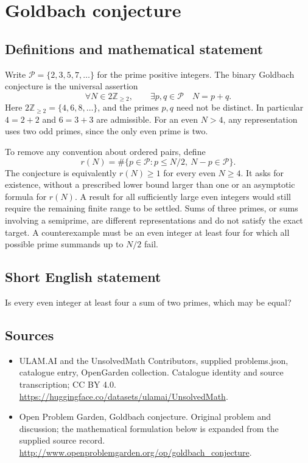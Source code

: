 \documentclass[11pt,a4paper]{article}
\begin{document}
\section*{Goldbach conjecture}\label{statement}

\subsection{Definitions and mathematical statement}
Write $\mathcal P=\{2,3,5,7,\ldots\}$ for the prime positive integers.
The binary Goldbach conjecture is the universal assertion
\[
 \forall N\in2\mathbb Z_{\ge2},\qquad
                  \exists p,q\in\mathcal P\quad N=p+q.
\]
Here $2\mathbb Z_{\ge2}=\{4,6,8,\ldots\}$, and the primes $p,q$
need not be distinct. In particular $4=2+2$ and $6=3+3$ are admissible.
For an even $N>4$, any representation uses two odd primes, since
the only even prime is two.

To remove any convention about ordered pairs, define
\[
 r(N)=\#\{p\in\mathcal P:p\le N/2,\ N-p\in\mathcal P\}.
\]
The conjecture is equivalently $r(N)\ge1$ for every even $N\ge4$.
It asks for existence, without a prescribed lower bound larger than
one or an asymptotic formula for $r(N)$. A result for all sufficiently
large even integers would still require the remaining finite range
to be settled. Sums of three primes, or sums involving a semiprime,
are different representations and do not satisfy the exact target.
A counterexample must be an even integer at least four for which
all possible prime summands up to $N/2$ fail.
\subsection{Short English statement}
Is every even integer at least four a sum of two primes, which may be equal?
\subsection{Sources}
\begin{itemize}
\item[S1] ULAM.AI and the UnsolvedMath Contributors, supplied problems.json, catalogue entry, OpenGarden collection. Catalogue identity and source transcription; CC BY 4.0.
\url{https://huggingface.co/datasets/ulamai/UnsolvedMath}.
\item[S2] Open Problem Garden, Goldbach conjecture. Original problem and discussion; the mathematical formulation below is expanded from the supplied source record.
\url{http://www.openproblemgarden.org/op/goldbach_conjecture}.
\end{itemize}
\end{document}
